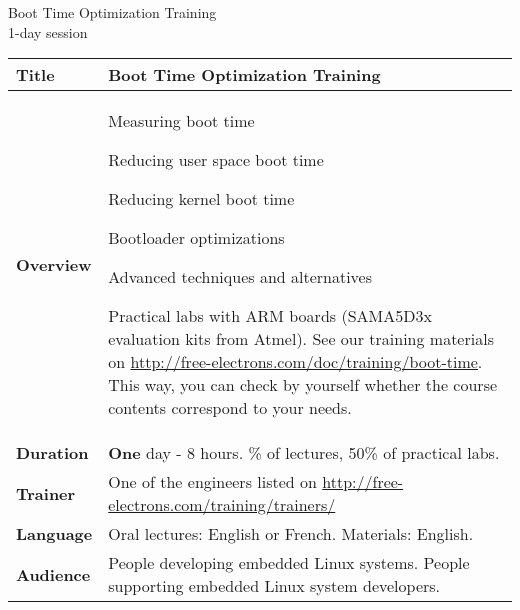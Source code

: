\documentclass[a4paper,12pt,obeyspaces,spaces,hyphens]{article}
\begin{document}
\thispagestyle{fancy}

\setlength{\arrayrulewidth}{0.8pt}

\begin{center}
\LARGE
Boot Time Optimization Training\\
\large
1-day session
\end{center}
\vspace{1cm}

\small
{}

 {
  \begin{tabularx}{\textwidth}{|g|h|}
    {\bf Title} & Boot Time Optimization Training\\
    \hline

    {\bf Overview} &
    Measuring boot time \par
    Reducing user space boot time \par
    Reducing kernel boot time \par
    Bootloader optimizations \par
    Advanced techniques and alternatives \par
    Practical labs with ARM boards (SAMA5D3x evaluation kits from Atmel).
    \newline\newline See our training materials on
    \url{http://free-electrons.com/doc/training/boot-time}.
    This way, you can check by yourself whether the course contents
    correspond to your needs. \\
    \hline

    {\bf Duration} & {\bf One} day - 8 hours.
    \% of lectures, 50\% of practical labs. \\
    \hline

    {\bf Trainer} & One of the engineers listed on
    \newline \url{http://free-electrons.com/training/trainers/}\\
    \hline

    {\bf Language} & Oral lectures: English or French.
    \newline Materials: English.\\
    \hline

    {\bf Audience} & People developing embedded Linux systems.
    \newline People supporting embedded Linux system developers. \\
    \hline


\end{tabularx}}
\end{document}
